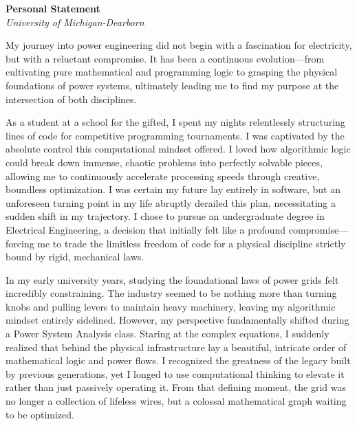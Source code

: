 \documentclass[11pt,a4paper]{article}
\begin{document}
\begin{center}
    \Large \textbf{Personal Statement} \\
    \vspace{0.2cm}
    \large \textit{University of Michigan-Dearborn}
\end{center}
\vspace{0.5cm}


My journey into power engineering did not begin with a fascination for electricity, but with a reluctant compromise. It has been a continuous evolution---from cultivating pure mathematical and programming logic to grasping the physical foundations of power systems, ultimately leading me to find my purpose at the intersection of both disciplines.

As a student at a school for the gifted, I spent my nights relentlessly structuring lines of code for competitive programming tournaments. I was captivated by the absolute control this computational mindset offered. I loved how algorithmic logic could break down immense, chaotic problems into perfectly solvable pieces, allowing me to continuously accelerate processing speeds through creative, boundless optimization. I was certain my future lay entirely in software, but an unforeseen turning point in my life abruptly derailed this plan, necessitating a sudden shift in my trajectory. I chose to pursue an undergraduate degree in Electrical Engineering, a decision that initially felt like a profound compromise---forcing me to trade the limitless freedom of code for a physical discipline strictly bound by rigid, mechanical laws.

In my early university years, studying the foundational laws of power grids felt incredibly constraining. The industry seemed to be nothing more than turning knobs and pulling levers to maintain heavy machinery, leaving my algorithmic mindset entirely sidelined. However, my perspective fundamentally shifted during a Power System Analysis class. Staring at the complex equations, I suddenly realized that behind the physical infrastructure lay a beautiful, intricate order of mathematical logic and power flows. I recognized the greatness of the legacy built by previous generations, yet I longed to use computational thinking to elevate it rather than just passively operating it. From that defining moment, the grid was no longer a collection of lifeless wires, but a colossal mathematical graph waiting to be optimized.
\end{document}
